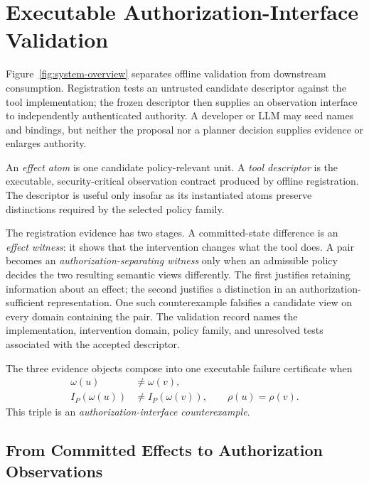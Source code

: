 \section{Executable Authorization-Interface Validation}



Figure~\ref{fig:system-overview} separates offline validation from downstream
consumption. Registration tests an untrusted candidate descriptor against the
tool implementation; the frozen descriptor then supplies an observation
interface to independently authenticated authority. A developer or LLM may seed names
and bindings, but neither the proposal nor a planner decision supplies evidence
or enlarges authority.

An \emph{effect atom} is one candidate policy-relevant unit.  A \emph{tool
descriptor} is the executable, security-critical observation contract produced
by offline registration.  The descriptor is useful only insofar as its
instantiated atoms preserve distinctions required by the selected policy
family.

The registration evidence has two stages.  A committed-state difference is an
\emph{effect witness}: it shows that the intervention changes what the tool
does.  A pair becomes an \emph{authorization-separating witness} only when an
admissible policy decides the two resulting semantic views differently.  The
first justifies retaining information about an effect; the second justifies a
distinction in an authorization-sufficient representation. One such
counterexample falsifies a candidate view on every domain containing the pair.
The validation record names the implementation, intervention domain, policy
family, and unresolved tests associated with the accepted descriptor.

The three evidence objects compose into one executable failure certificate when
\[
\begin{aligned}
  \omega(u)&\ne\omega(v),\\
  I_P(\omega(u))&\ne I_P(\omega(v)),\qquad \rho(u)=\rho(v).
\end{aligned}
\]
This triple is an \emph{authorization-interface counterexample}.

\subsection{From Committed Effects to Authorization Observations}

